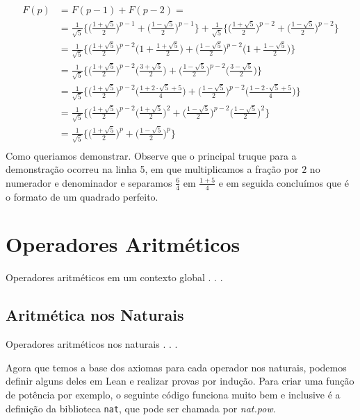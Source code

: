 \begin{align*}
    F(p) &= F(p-1) + F(p-2) = \\
    &= \frac{1}{\sqrt{5}}\bigg \{ \Big (\frac{1+\sqrt{5}}{2} \Big )^{p-1} + \Big (\frac{1-\sqrt{5}}{2}\Big )^{p-1}\bigg \} + \frac{1}{\sqrt{5}}\bigg \{ \Big (\frac{1+\sqrt{5}}{2} \Big )^{p-2} + \Big (\frac{1-\sqrt{5}}{2}\Big )^{p-2}\bigg \}\\
    &= \frac{1}{\sqrt{5}}\bigg \{ \Big (\frac{1+\sqrt{5}}{2} \Big )^{p-2} \Big( 1 + \frac{1+\sqrt{5}}{2}\Big) + \Big (\frac{1-\sqrt{5}}{2}\Big )^{p-2} \Big( 1 +\frac{1 - \sqrt{5}}{2}\Big)\bigg \}\\
     &= \frac{1}{\sqrt{5}}\bigg \{ \Big (\frac{1+\sqrt{5}}{2} \Big )^{p-2} \Big( \frac{3+\sqrt{5}}{2}\Big) + \Big (\frac{1-\sqrt{5}}{2}\Big )^{p-2} \Big( \frac{3 - \sqrt{5}}{2}\Big)\bigg \}\\
     &= \frac{1}{\sqrt{5}}\bigg \{ \Big (\frac{1+\sqrt{5}}{2} \Big )^{p-2} \Big( \frac{1+2\cdot \sqrt{5} + 5}{4}\Big) + \Big (\frac{1-\sqrt{5}}{2}\Big )^{p-2} \Big( \frac{1 - 2\cdot \sqrt{5} +5}{4}\Big)\bigg \}\\
     &= \frac{1}{\sqrt{5}}\bigg \{ \Big (\frac{1+\sqrt{5}}{2} \Big )^{p-2} \Big( \frac{1+\sqrt{5}}{2}\Big)^2 + \Big (\frac{1-\sqrt{5}}{2}\Big )^{p-2} \Big( \frac{1 - \sqrt{5}}{2}\Big)^2 \bigg \}\\
     &= \frac{1}{\sqrt{5}}\bigg \{ \Big (\frac{1+\sqrt{5}}{2} \Big )^p + \Big (\frac{1-\sqrt{5}}{2}\Big )^p\bigg \} \\
\end{align*}
Como queriamos demonstrar. Observe que o principal truque para a demonstração ocorreu na linha 5, 
em que multiplicamos a fração por $2$ no numerador e denominador e separamos $\frac{6}{4}$ em $\frac{1+5}{4}$
e em seguida concluímos que é o formato de um quadrado perfeito.

\section{Operadores Aritméticos}

Operadores aritméticos em um contexto global . . .

\subsection{Aritmética nos Naturais}

Operadores aritméticos nos naturais . . .

Agora que temos a base dos axiomas para cada operador nos naturais, podemos definir alguns deles em Lean e realizar provas por indução. Para criar uma função de potência por exemplo, o seguinte código funciona muito bem e inclusive é a definição da biblioteca \lstinline{nat}, que pode ser chamada por \textit{nat.pow}.

